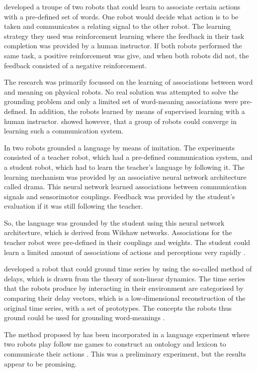 \citet{yancostein} developed a troupe of two robots that could learn to associate certain actions with a pre-defined set of words. One robot would decide what action is to be taken and communicates a relating signal to the other robot. The learning strategy they used was reinforcement learning where the feedback in their task completion was provided by a human instructor. If both robots performed the same task, a positive reinforcement was give, and when both robots did not, the feedback consisted of a negative reinforcement.

The research was primarily focussed on the learning of associations between word and meaning on physical robots. No real solution was attempted to solve the grounding problem and only a limited set of word-meaning associations were pre-defined. In addition, the robots learned by means of supervised learning with a human instructor. \citet{yancostein} showed however, that a group of robots could converge in learning such a communication system.


In \citet{billard:1997a} two robots grounded a language by means of imitation. The experiments consisted of a teacher robot, which had a pre-defined communication system, and a student robot, which had to learn the teacher's language by following it. The learning mechanism was provided by an associative neural network architecture called {\sc drama}. This neural network learned associations between communication signals and sensorimotor couplings. Feedback was provided by the student's evaluation if it was still following the teacher.

So, the language was grounded by the student using this neural network architecture, which is derived from Wilshaw networks. Associations for the teacher robot were pre-defined in their couplings and weights. The student could learn a limited amount of associations of actions and perceptions very rapidly \citep{billard:1998}.


\citet{rosenstein:1998a} developed a robot that could ground time series by using the so-called method of delays, which is drawn from the theory of non-linear dynamics. The time series that the robots produce by interacting in their environment are categorised by comparing their delay vectors, which is a low-dimensional reconstruction of the original time series, with a set of prototypes. The concepts the robots thus ground could be used for grounding word-meanings \citep{rosenstein:1998b}.

The method proposed by \citet{rosenstein:1998a} has been incorporated in a language experiment where two robots play {\sc follow me games} to construct an ontology and lexicon to communicate their actions \citep{vogt:1999a,vogt:2000}. This was a preliminary experiment, but the results appear to be promising.

